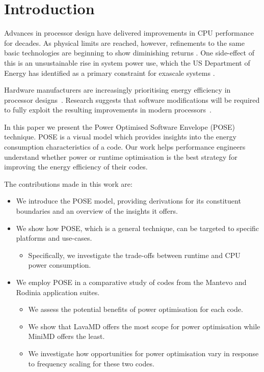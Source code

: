 \section{Introduction}
Advances in processor design have delivered improvements in CPU performance for decades. As physical limits are reached, however, refinements to the same basic technologies are beginning to show diminishing returns \cite{esmaeilzadeh:2011aa}. One side-effect of this is an unsustainable rise in system power use, which the US Department of Energy has identified as a primary constraint for exascale systems \cite{shalf:2011aa}.

Hardware manufacturers are increasingly prioritising energy efficiency in processor designs~\cite{kurd:2014aa}. 
Research suggests that software modifications will be required to fully exploit the resulting improvements in modern processors~\cite{shao:2013aa}.

In this paper we present the Power Optimised Software Envelope (POSE) technique.
POSE is a visual model which provides insights into the energy consumption characteristics of a code.
Our work helps performance engineers understand whether power or runtime optimisation is the best strategy for improving the energy efficiency of their codes.

\medskip \noindent
The contributions made in this work are:
\begin{itemize}
  \item We introduce the POSE model, providing derivations for its constituent boundaries and an overview of the insights it offers.
  \item We show how POSE, which is a general technique, can be targeted to specific platforms and use-cases. 
  \begin{itemize}
    \item Specifically, we investigate the trade-offs between runtime and CPU power consumption.
  \end{itemize}
  \item We employ POSE in a comparative study of codes from the Mantevo and Rodinia application suites.
  \begin{itemize}
    \item We assess the potential benefits of power optimisation for each code.
    \item We show that LavaMD offers the most scope for power optimisation while MiniMD offers the least.
    \item We investigate how opportunities for power optimisation vary in response to frequency scaling for these two codes.
  \end{itemize}
\end{itemize}


